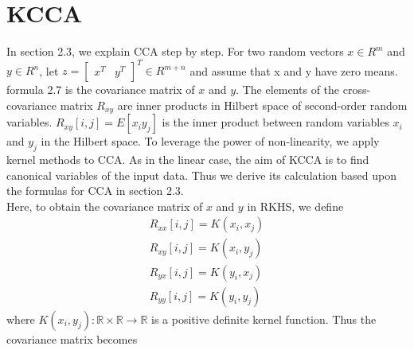 \documentclass[12pt]{report} %
\begin{document}
\section{KCCA}
In section 2.3, we explain CCA step by step. For two random vectors $x\in R^{m}$ and $y\in R^{n}$, let $z= \begin{bmatrix}x^T & y^T\end{bmatrix}^T \in R^{m+n}$ and assume that x and y have zero means. formula 2.7 is the covariance matrix of $x$ and $y$. The elements of the cross-covariance matrix $R_{xy}$ are inner products in Hilbert space of second-order random variables. $R_{xy}[i,j]=E[x_{i}y_{j}]$ is the inner product between random variables $x_{i}$ and $y_{j}$ in the Hilbert space. To leverage the power of non-linearity, we apply kernel methods to CCA. As in the linear case, the aim of KCCA is to find canonical variables of the input data. Thus we derive its calculation based upon the formulas for CCA in section 2.3. \\
Here, to obtain the covariance matrix of $x$ and $y$ in RKHS, we define
\begin{equation}
\begin{split}
R_{xx}[i,j] = K(x_{i},x_{j}) \\
R_{xy}[i,j] = K(x_{i},y_{j}) \\
R_{yx}[i,j] = K(y_{i},x_{j}) \\
R_{yy}[i,j] = K(y_{i},y_{j})
\end{split}
\end{equation}
where $K(x_{i},y_{j}): \mathbb{R} \times \mathbb{R} \to \mathbb{R}$ is a positive definite kernel function. Thus the covariance matrix becomes
\end{document}
